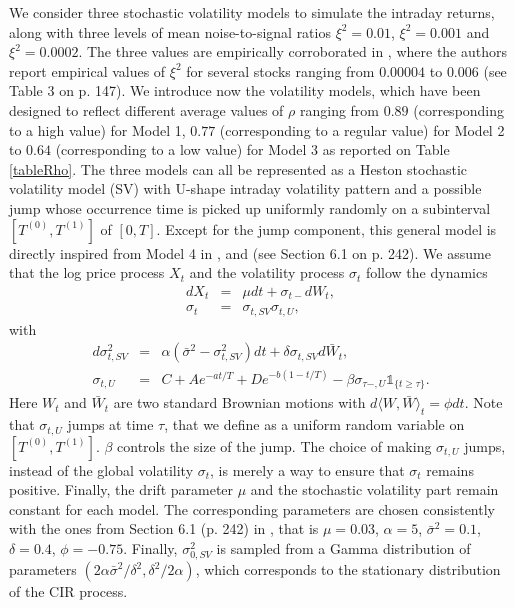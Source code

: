 \documentclass[11pt]{article}
\numberwithin{equation}{section}
\theoremstyle{plain}
\theoremstyle{remark}
\begin{document}
\smallskip 
We consider three stochastic volatility models to simulate the intraday returns, along with three levels of mean noise-to-signal ratios $\xi^2 = 0.01$, $\xi^2 = 0.001$ and $\xi^2 = 0.0002$. The three values are empirically corroborated in \cite{hansen2006realized}, where the authors report empirical values of $\xi^2$ for several stocks ranging from $0.00004$ to $0.006$ (see Table 3 on p. 147). We introduce now the volatility models, which have been designed to reflect different average values of $\rho$ ranging from $0.89$ (corresponding to a high value) for Model 1, $0.77$ (corresponding to a regular value) for Model 2 to $0.64$ (corresponding to a low value) for Model 3 as reported on Table \ref{tableRho}. The three models can all be represented as a Heston stochastic volatility model (SV) with U-shape intraday volatility pattern and a possible jump whose occurrence time is picked up uniformly randomly on a subinterval $[T^{(0)},T^{(1)}]$ of $[0,T]$. Except for the jump component, this general model is directly inspired from Model 4 in \cite{andersen2012jump}, and \cite{xiu2010quasi} (see Section 6.1 on p. 242). We assume that the log price process $X_t$ and the volatility process $\sigma_t$ follow the dynamics
\begin{eqnarray*}
dX_t &=& \mu dt + \sigma_{t-}dW_t,\\
\sigma_t &=& \sigma_{t,SV}\sigma_{t,U},
\end{eqnarray*}
with
\begin{eqnarray*} 
d\sigma_{t,SV}^2 & = & \alpha(\bar{\sigma}^2 - \sigma_{t,SV}^2)dt + \delta \sigma_{t,SV}d\bar{W}_t,\\   
\sigma_{t,U} & = & C + Ae^{-at/T} + De^{-b(1-t/T)} -  \beta\sigma_{\tau-,U}\mathbb{1}_{\{t \geq \tau \}}.
\end{eqnarray*}
Here $W_t$ and $\bar{W}_t$ are two standard Brownian motions with $d\langle W,\bar{W} \rangle_t = \phi dt$. Note that $\sigma_{t,U}$ jumps at time $\tau$, that we define as a uniform random variable on $[T^{(0)},T^{(1)}]$. $\beta$ controls the size of the jump. The choice of making $\sigma_{t,U}$ jumps, instead of the global volatility $\sigma_t$, is merely a way to ensure that $\sigma_t$ remains positive. Finally, the drift parameter $\mu$ and the stochastic volatility part remain constant for each model. The corresponding parameters are chosen consistently with the ones from Section 6.1 (p. 242) in \cite{xiu2010quasi}, that is $\mu = 0.03$, $\alpha = 5$, $\bar{\sigma}^2 = 0.1$, $\delta = 0.4$, $\phi = -0.75$. Finally, $\sigma_{0,SV}^2$ is sampled from a Gamma distribution of parameters $(2\alpha\bar{\sigma}^2/\delta^2,\delta^2/2\alpha)$, which corresponds to the stationary distribution of the CIR process.
\end{document}
